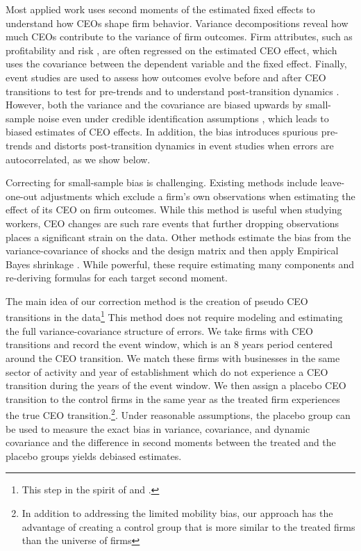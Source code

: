 \documentclass[11pt,a4paper]{article}
\begin{document}
Most applied work uses second moments of the estimated fixed effects to understand how CEOs shape firm behavior. Variance decompositions reveal how much CEOs contribute to the variance of firm outcomes. Firm attributes, such as profitability \citep{mackey2008effect} and risk \citep{schoar2024effect}, are often regressed on the estimated CEO effect, which uses the covariance between the dependent variable and the fixed effect. Finally, event studies are used to assess how outcomes evolve before and after CEO transitions to test for pre-trends and to understand post-transition dynamics \citep{schoar2024effect}. However, both the variance and the covariance are  biased upwards by small-sample noise even under credible identification assumptions \citep{andrews2008high,gaure2014correlation,Bonhomme2023-dx}, which leads to biased estimates of CEO effects. In addition, the bias introduces spurious pre-trends and distorts post-transition dynamics in event studies when errors are autocorrelated, as we show below.

Correcting for small-sample bias is challenging. Existing methods include leave-one-out adjustments \citep{kline2020leave} which exclude a firm's own observations when estimating the effect of its CEO on firm outcomes. While this method is useful when studying workers, CEO changes are such rare events that further dropping observations places a significant strain on the data. Other methods estimate the bias from the variance-covariance of shocks and the design matrix and then apply Empirical Bayes shrinkage \citep{andrews2008high,Bonhomme2023-dx,kline2024firm}. While powerful, these require estimating many components and re-deriving formulas for each target second moment.

The main idea of our correction method is the creation of pseudo CEO transitions in the data\footnote{This step in the spirit of \cite{fitza2014use} and \cite{jarosiewicz2023revisiting}.} This method does not require modeling and estimating the full variance-covariance structure of errors. We take firms with CEO transitions and record the event window, which is an 8 years period centered around the CEO transition. We match these firms with businesses in the same sector of activity and year of establishment which do not experience a CEO transition during the years of the event window. We then assign a placebo CEO transition to the control firms in the same year as the treated firm experiences the true CEO transition.\footnote{In addition to addressing the limited mobility bias, our approach has the advantage of creating a control group that is more similar to the treated firms than the universe of firms}. Under reasonable assumptions, the placebo group can be used to measure the exact bias in variance, covariance, and dynamic covariance and the difference in second moments between the treated and the placebo groups yields debiased estimates. 
\end{document}
